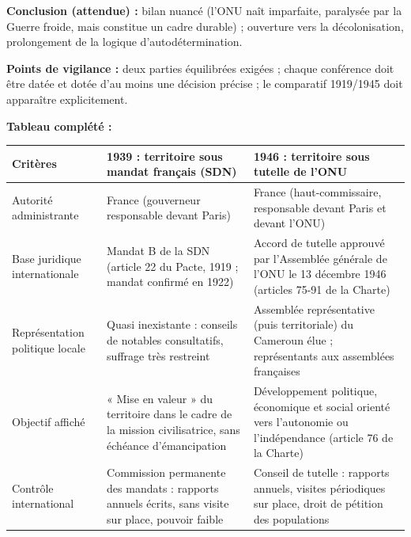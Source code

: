 \documentclass[11pt]{article}
\begin{document}
\begin{corrige}
\textbf{Conclusion (attendue) :} bilan nuancé (l'ONU naît imparfaite, paralysée par la Guerre froide, mais constitue un cadre durable) ; ouverture vers la décolonisation, prolongement de la logique d'autodétermination.

\textbf{Points de vigilance :} deux parties équilibrées exigées ; chaque conférence doit être datée et dotée d'au moins une décision précise ; le comparatif 1919/1945 doit apparaître explicitement.
\end{corrige}

\begin{corrige}
\textbf{Tableau complété :}
\begin{center}
\begin{tabularx}{\linewidth}{|l|X|X|}\hline
\textbf{Critères} & \textbf{1939 : territoire sous mandat français (SDN)} & \textbf{1946 : territoire sous tutelle de l'ONU} \\ \hline
Autorité administrante & France (gouverneur responsable devant Paris) & France (haut-commissaire, responsable devant Paris et devant l'ONU) \\ \hline
Base juridique internationale & Mandat B de la SDN (article 22 du Pacte, 1919 ; mandat confirmé en 1922) & Accord de tutelle approuvé par l'Assemblée générale de l'ONU le 13 décembre 1946 (articles 75-91 de la Charte) \\ \hline
Représentation politique locale & Quasi inexistante : conseils de notables consultatifs, suffrage très restreint & Assemblée représentative (puis territoriale) du Cameroun élue ; représentants aux assemblées françaises \\ \hline
Objectif affiché & « Mise en valeur » du territoire dans le cadre de la mission civilisatrice, sans échéance d'émancipation & Développement politique, économique et social orienté vers l'autonomie ou l'indépendance (article 76 de la Charte) \\ \hline
Contrôle international & Commission permanente des mandats : rapports annuels écrits, sans visite sur place, pouvoir faible & Conseil de tutelle : rapports annuels, visites périodiques sur place, droit de pétition des populations \\ \hline
\end{tabularx}
\end{center}


\end{corrige}
\end{document}
